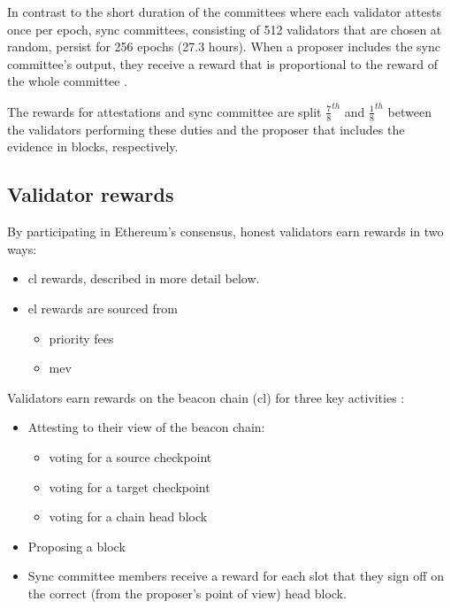\documentclass[UTF8]{article}
\begin{document}
In contrast to the short duration of the committees where each validator attests once per epoch, sync committees, consisting of 512 validators that are chosen at random, persist for 256 epochs (27.3 hours).  When a proposer includes the sync committee's output, they receive a reward that is proportional to the reward of the whole committee \cite{Edgington2023}.

The rewards for attestations and sync committee are split $\frac{7}{8}^{th}$ and $\frac{1}{8}^{th}$ between the validators performing these duties and the proposer that includes the evidence in blocks, respectively.


\subsection{Validator rewards}
\label{rewards}

By participating in Ethereum’s consensus, honest validators earn rewards in two ways\cite{breslina}:
\begin{itemize}
\item \gls{cl} rewards, described in more detail below.
\item \gls{el} rewards are sourced from
	\begin{itemize}
	\item priority fees
	\item \gls{mev}
	\end{itemize}

\end{itemize}

Validators earn rewards on the beacon chain (\gls{cl}) for three key activities \cite{Edgington2023}:
\begin{itemize}
\item Attesting to their view of the beacon chain:
	\begin{itemize}
	\item voting for a source checkpoint
	\item voting for a target checkpoint
	\item voting for a chain head block
	\end{itemize}
\item Proposing a block	
\item Sync committee members receive a reward for each slot that they sign off on the correct (from the proposer's point of view) head block.
\end{itemize}
\end{document}
